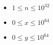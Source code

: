 \begin{itemize}
	\tightlist
	\item $1 \le n \le 10^{32}$
	\item $0 \le x \le 10^{64}$
	\item $0 \le y \le 10^{64}$
\end{itemize}

